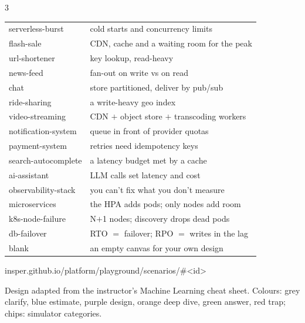 \documentclass[10pt,a4paper]{article}
\begin{document}
\begin{multicols*}{3}
{\begin{tabularx}{\linewidth}{@{}>{\ttfamily}l X@{}}
serverless-burst & cold starts and concurrency limits \\
flash-sale & CDN, cache and a waiting room for the peak \\
url-shortener & key lookup, read-heavy \\
news-feed & fan-out on write vs on read \\
chat & store partitioned, deliver by pub/sub \\
ride-sharing & a write-heavy geo index \\
video-streaming & CDN $+$ object store $+$ transcoding workers \\
notification-system & queue in front of provider quotas \\
payment-system & retries need idempotency keys \\
search-autocomplete & a latency budget met by a cache \\
ai-assistant & LLM calls set latency and cost \\
observability-stack & you can't fix what you don't measure \\
microservices & the HPA adds pods; only nodes add room \\
k8s-node-failure & N$+$1 nodes; discovery drops dead pods \\
db-failover & RTO $=$ failover; RPO $=$ writes in the lag \\
blank & an empty canvas for your own design \\
\end{tabularx}}
{\scriptsize\color{soft}insper.github.io/platform/playground/scenarios/\#\textless id\textgreater\par}
\vspace{.3em}
{\scriptsize\color{soft}Design adapted from the instructor's Machine Learning cheat sheet. Colours: grey clarify, blue estimate, purple design, orange deep dive, green answer, red trap; chips: simulator categories.\par}
\end{multicols*}
\end{document}
